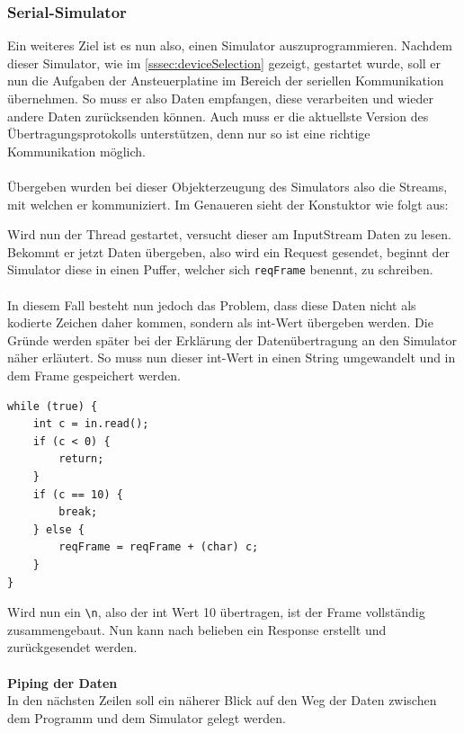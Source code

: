 \subsubsection{Serial-Simulator}\label{sssec:serialSim}
Ein weiteres Ziel ist es nun also, einen Simulator auszuprogrammieren.
Nachdem dieser Simulator, wie im \autoref{sssec:deviceSelection} gezeigt, gestartet wurde, soll er nun die Aufgaben der Ansteuerplatine im Bereich der seriellen Kommunikation übernehmen.
So muss er also Daten empfangen, diese verarbeiten und wieder andere Daten zurücksenden können.
Auch muss er die aktuellste Version des Übertragungsprotokolls unterstützen, denn nur so ist eine richtige Kommunikation möglich.\\\\
Übergeben wurden bei dieser Objekterzeugung des Simulators also die Streams, mit welchen er kommuniziert.
Im Genaueren sieht der Konstuktor wie folgt aus:

Wird nun der Thread gestartet, versucht dieser am InputStream Daten zu lesen.
Bekommt er jetzt Daten übergeben, also wird ein Request gesendet, beginnt der Simulator diese in einen Puffer, welcher sich \lstinline[style=java]{reqFrame} benennt, zu schreiben.\\\\
In diesem Fall besteht nun jedoch das Problem, dass diese Daten nicht als kodierte Zeichen daher kommen, sondern als int-Wert übergeben werden.
Die Gründe werden später bei der Erklärung der Datenübertragung an den Simulator näher erläutert.
So muss nun dieser int-Wert in einen String umgewandelt und in dem Frame gespeichert werden.
\begin{lstlisting}[style=java,caption=Umwandlung von Zeichen,label=stringParse]
while (true) {
    int c = in.read();
    if (c < 0) {
        return;
    }
    if (c == 10) {
        break;
    } else {
        reqFrame = reqFrame + (char) c;
    }
}
\end{lstlisting}
Wird nun ein \verb!\n!, also der int Wert 10 übertragen, ist der Frame vollständig zusammengebaut.
Nun kann nach belieben ein Response erstellt und zurückgesendet werden.\\\\
\textbf{Piping der Daten}\\
In den nächsten Zeilen soll ein näherer Blick auf den Weg der Daten zwischen dem Programm und dem Simulator gelegt werden.\\
